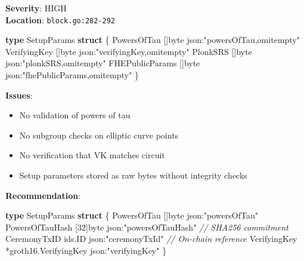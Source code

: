 \documentclass[
]{article}
\newenvironment{Shaded}{}{}
\newcommand{\CommentTok}[1]{\textcolor[rgb]{0.38,0.63,0.69}{\textit{#1}}}
\newcommand{\DataTypeTok}[1]{\textcolor[rgb]{0.56,0.13,0.00}{#1}}
\newcommand{\DecValTok}[1]{\textcolor[rgb]{0.25,0.63,0.44}{#1}}
\newcommand{\KeywordTok}[1]{\textcolor[rgb]{0.00,0.44,0.13}{\textbf{#1}}}
\newcommand{\NormalTok}[1]{#1}
\newcommand{\OperatorTok}[1]{\textcolor[rgb]{0.40,0.40,0.40}{#1}}
\newcommand{\StringTok}[1]{\textcolor[rgb]{0.25,0.44,0.63}{#1}}
\providecommand{\tightlist}{%
  \setlength{\itemsep}{0pt}\setlength{\parskip}{0pt}}
\begin{document}
\textbf{Severity}: HIGH\\
\textbf{Location}: \texttt{block.go:282-292}

\begin{Shaded}
\begin{Highlighting}[]
\KeywordTok{type}\NormalTok{ SetupParams }\KeywordTok{struct} \OperatorTok{\{}
\NormalTok{    PowersOfTau       }\OperatorTok{[]}\DataTypeTok{byte} \StringTok{\textasciigrave{}json:"powersOfTau,omitempty"\textasciigrave{}}
\NormalTok{    VerifyingKey      }\OperatorTok{[]}\DataTypeTok{byte} \StringTok{\textasciigrave{}json:"verifyingKey,omitempty"\textasciigrave{}}
\NormalTok{    PlonkSRS          }\OperatorTok{[]}\DataTypeTok{byte} \StringTok{\textasciigrave{}json:"plonkSRS,omitempty"\textasciigrave{}}
\NormalTok{    FHEPublicParams   }\OperatorTok{[]}\DataTypeTok{byte} \StringTok{\textasciigrave{}json:"fhePublicParams,omitempty"\textasciigrave{}}
\OperatorTok{\}}
\end{Highlighting}
\end{Shaded}

\textbf{Issues}:

\begin{itemize}
\tightlist
\item
  No validation of powers of tau
\item
  No subgroup checks on elliptic curve points
\item
  No verification that VK matches circuit
\item
  Setup parameters stored as raw bytes without integrity checks
\end{itemize}

\textbf{Recommendation}:

\begin{Shaded}
\begin{Highlighting}[]
\KeywordTok{type}\NormalTok{ SetupParams }\KeywordTok{struct} \OperatorTok{\{}
\NormalTok{    PowersOfTau       }\OperatorTok{[]}\DataTypeTok{byte} \StringTok{\textasciigrave{}json:"powersOfTau"\textasciigrave{}}
\NormalTok{    PowersOfTauHash   }\OperatorTok{[}\DecValTok{32}\OperatorTok{]}\DataTypeTok{byte} \StringTok{\textasciigrave{}json:"powersOfTauHash"\textasciigrave{}}  \CommentTok{// SHA256 commitment}
\NormalTok{    CeremonyTxID      ids}\OperatorTok{.}\NormalTok{ID }\StringTok{\textasciigrave{}json:"ceremonyTxId"\textasciigrave{}}       \CommentTok{// On{-}chain reference}
\NormalTok{    VerifyingKey      }\OperatorTok{*}\NormalTok{groth16}\OperatorTok{.}\NormalTok{VerifyingKey }\StringTok{\textasciigrave{}json:"verifyingKey"\textasciigrave{}}
\OperatorTok{\}}
\end{Highlighting}
\end{Shaded}
\end{document}

